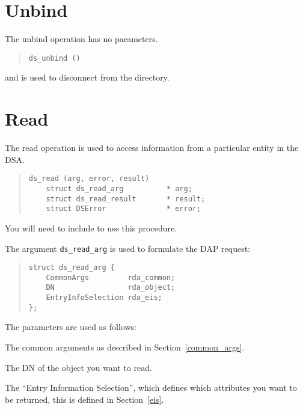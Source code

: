 \section{Unbind}

The unbind operation has no parameters.
\begin{quote}\small\begin{verbatim}
ds_unbind ()
\end{verbatim}\end{quote}
and is used to disconnect from the directory.

\section {Read}

The read operation is used to access information from a particular
entity in the DSA.

\begin{quote}\small\begin{verbatim}
ds_read (arg, error, result)
    struct ds_read_arg          * arg;    
    struct ds_read_result       * result;
    struct DSError              * error;
\end{verbatim}\end{quote}

You will need to include  to use this procedure.

The argument \verb"ds_read_arg" is used to formulate the DAP request:

\begin{quote}\small\begin{verbatim}
struct ds_read_arg {
    CommonArgs         rda_common;
    DN                 rda_object;
    EntryInfoSelection rda_eis;
};
\end{verbatim}\end{quote}

The parameters are used as follows:
\begin{describe}
\item [\verb"rda\_common":] The common arguments as described in
Section~\ref{common_args}.
\item [\verb"rda\_object":] The DN of the object you want to read.
\item [\verb"rda\_eis":] The ``Entry Information Selection'', which defines
which attributes you want to be returned, this is defined in
Section~\ref{eis}.
\end{describe}

